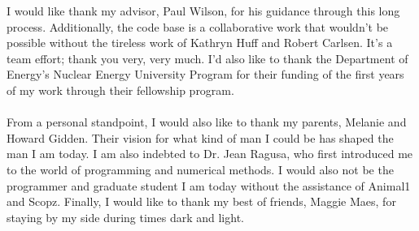 

I would like thank my advisor, Paul Wilson, for his guidance through this long
process. Additionally, the \Cyclus code base is a collaborative work that
wouldn't be possible without the tireless work of Kathryn Huff and Robert
Carlsen. It's a team effort; thank you very, very much. I'd also like to thank
the Department of Energy's Nuclear Energy University Program for their funding
of the first years of my work through their fellowship program.
\\ \\
From a personal standpoint, I would also like to thank my parents, Melanie and
Howard Gidden. Their vision for what kind of man I could be has shaped the man I
am today. I am also indebted to Dr. Jean Ragusa, who first introduced me to the
world of programming and numerical methods. I would also not be the programmer
and graduate student I am today without the assistance of Animal1 and
Scopz. Finally, I would like to thank my best of friends, Maggie Maes, for
staying by my side during times dark and light.
